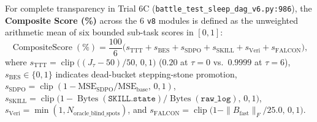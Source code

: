 \documentclass[11pt,a4paper]{article}
\begin{document}
\begin{table}[ht!]
\begin{tabular}{p{3.6cm}p{5.8cm}p{6.0cm}}
\bottomrule
\end{tabular}
\end{table}

For complete transparency in Trial 6C (\texttt{battle\_test\_sleep\_dag\_v6.py:986}), the \textbf{Composite Score (\%)} across the 6 \texttt{v8} modules is defined as the unweighted arithmetic mean of six bounded sub-task scores in $[0, 1]$:
\begin{equation}
\operatorname{CompositeScore}(\%) = \frac{100}{6}\bigl(s_{\text{TTT}} + s_{\text{BES}} + s_{\text{SDPO}} + s_{\text{SKILL}} + s_{\text{Veri}} + s_{\text{FALCON}}\bigr),
\tag{23}\label{eq:composite_score}
\end{equation}
where $s_{\text{TTT}} = \operatorname{clip}\bigl((J_\tau - 50)/50,\, 0, 1\bigr)$ ($0.20$ at $\tau=0$ vs.\ $0.9999$ at $\tau=6$), $s_{\text{BES}} \in \{0, 1\}$ indicates dead-bucket stepping-stone promotion, $s_{\text{SDPO}} = \operatorname{clip}(1 - \text{MSE}_{\text{SDPO}}/\text{MSE}_{\text{base}},\, 0, 1)$, $s_{\text{SKILL}} = \operatorname{clip}\bigl(1 - \operatorname{Bytes}(\texttt{SKILL.state})/\operatorname{Bytes}(\texttt{raw\_log}),\, 0, 1\bigr)$, $s_{\text{Veri}} = \min(1, N_{\text{oracle\_blind\_spots}})$, and $s_{\text{FALCON}} = \operatorname{clip}\bigl(1 - \|B_{\text{fast}}\|_F / 25.0,\, 0, 1\bigr)$.
\end{document}
